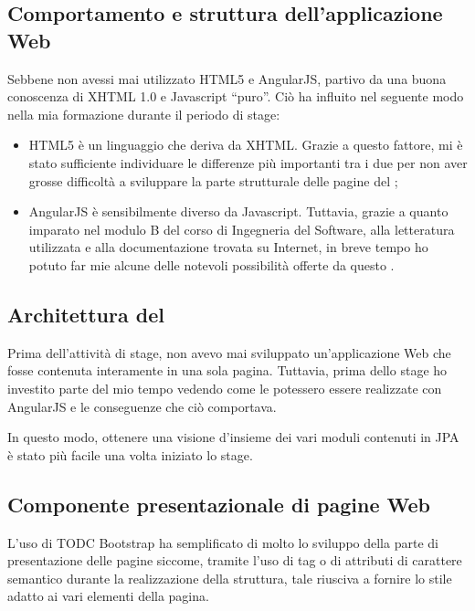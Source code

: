 \subsection{Comportamento e struttura dell'applicazione Web}

Sebbene non avessi mai utilizzato HTML5 e AngularJS, partivo da una buona
conoscenza di XHTML 1.0 e Javascript ``puro''. Ciò ha influito nel seguente
modo nella mia formazione durante il periodo di stage:

\begin{itemize}
\item HTML5 è un linguaggio che deriva da XHTML. Grazie a questo fattore, mi
  è stato sufficiente individuare le differenze più importanti tra i due per
  non aver grosse difficoltà a sviluppare la parte strutturale delle pagine
  del \FREND;
\item AngularJS è sensibilmente diverso da Javascript. Tuttavia, grazie
  a quanto imparato nel modulo B del corso di Ingegneria del Software, alla
  letteratura utilizzata e alla documentazione trovata su Internet, in breve
  tempo ho potuto far mie alcune delle notevoli possibilità offerte da questo
  .
\end{itemize}

\subsection{Architettura del \FREND{}}

Prima dell'attività di stage, non avevo mai sviluppato un'applicazione Web che
fosse contenuta interamente in una sola pagina. Tuttavia, prima dello stage ho
investito parte del mio tempo vedendo come le  potessero essere
realizzate con AngularJS e le conseguenze che ciò comportava.

In questo modo, ottenere una visione d'insieme dei vari moduli contenuti in
JPA è stato più facile una volta iniziato lo stage.

\subsection{Componente presentazionale di pagine Web}

L'uso di TODC Bootstrap ha semplificato di molto lo sviluppo della parte di
presentazione delle pagine siccome, tramite l'uso di tag o di attributi di
carattere semantico durante la realizzazione della struttura, tale
 riusciva a fornire lo stile adatto ai vari elementi della
pagina.

